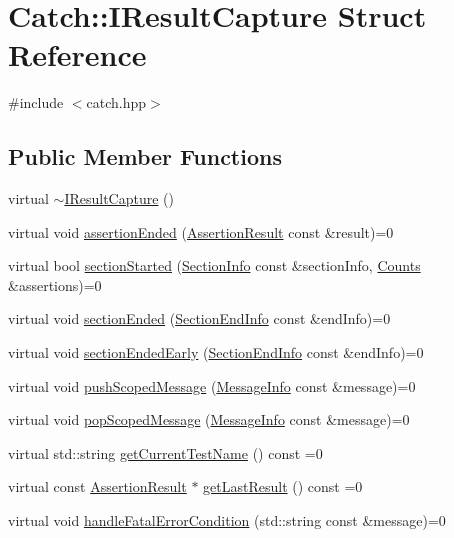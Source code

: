 \hypertarget{struct_catch_1_1_i_result_capture}{}\section{Catch\+:\+:I\+Result\+Capture Struct Reference}
\label{struct_catch_1_1_i_result_capture}


{\ttfamily \#include $<$catch.\+hpp$>$}

\subsection*{Public Member Functions}
\begin{DoxyCompactItemize}
\item 
virtual \hyperlink{struct_catch_1_1_i_result_capture_a3bd16719d6772b7470887fc36c6d0808}{$\sim$\+I\+Result\+Capture} ()
\item 
virtual void \hyperlink{struct_catch_1_1_i_result_capture_ae45e08bccc5fb434656d4f2e44742223}{assertion\+Ended} (\hyperlink{class_catch_1_1_assertion_result}{Assertion\+Result} const \&result)=0
\item 
virtual bool \hyperlink{struct_catch_1_1_i_result_capture_a5b76ed52badcb64cf374202e12b81a03}{section\+Started} (\hyperlink{struct_catch_1_1_section_info}{Section\+Info} const \&section\+Info, \hyperlink{struct_catch_1_1_counts}{Counts} \&assertions)=0
\item 
virtual void \hyperlink{struct_catch_1_1_i_result_capture_a4e152bc43dc0933684e31fa67a58195d}{section\+Ended} (\hyperlink{struct_catch_1_1_section_end_info}{Section\+End\+Info} const \&end\+Info)=0
\item 
virtual void \hyperlink{struct_catch_1_1_i_result_capture_afcc71eef8ca821ae132cced4a2be6988}{section\+Ended\+Early} (\hyperlink{struct_catch_1_1_section_end_info}{Section\+End\+Info} const \&end\+Info)=0
\item 
virtual void \hyperlink{struct_catch_1_1_i_result_capture_a91d154c1e087e383dcde5aad95cb6a05}{push\+Scoped\+Message} (\hyperlink{struct_catch_1_1_message_info}{Message\+Info} const \&message)=0
\item 
virtual void \hyperlink{struct_catch_1_1_i_result_capture_a42bcb13276706bf8c3ce081ce16d37fd}{pop\+Scoped\+Message} (\hyperlink{struct_catch_1_1_message_info}{Message\+Info} const \&message)=0
\item 
virtual std\+::string \hyperlink{struct_catch_1_1_i_result_capture_aea1617f4a84cc648246aa3ed6918b5bf}{get\+Current\+Test\+Name} () const =0
\item 
virtual const \hyperlink{class_catch_1_1_assertion_result}{Assertion\+Result} $\ast$ \hyperlink{struct_catch_1_1_i_result_capture_ab18872c89fab97405a56e9c6a4919736}{get\+Last\+Result} () const =0
\item 
virtual void \hyperlink{struct_catch_1_1_i_result_capture_a7d995222301e6605f26549726b30c3ee}{handle\+Fatal\+Error\+Condition} (std\+::string const \&message)=0
\end{DoxyCompactItemize}


